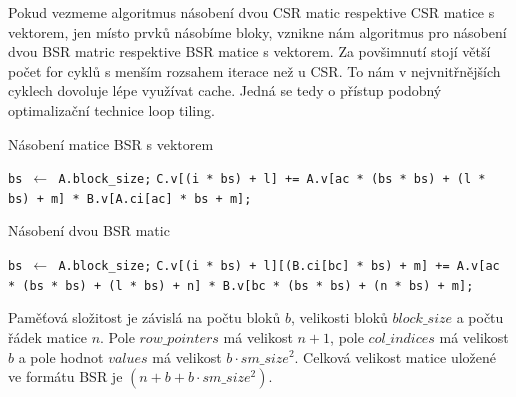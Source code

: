 Pokud vezmeme algoritmus násobení dvou CSR matic respektive CSR matice s vektorem, jen místo prvků násobíme bloky, vznikne nám algoritmus pro násobení dvou BSR matric respektive BSR matice s vektorem. Za povšimnutí stojí větší počet for cyklů s menším rozsahem iterace než u CSR. To nám v nejvnitřnějších cyklech dovoluje lépe využívat cache. Jedná se tedy o přístup podobný optimalizační technice loop tiling\cite{Wolf:1991:DLO:113445.113449}.

\label{alg:bsr-mvm}
\begin{algorithm}[H]
	\caption{Násobení matice BSR s vektorem}\label{bsr-mvm}
	\begin{algorithmic}[1]
		\State \texttt{bs $\gets$ A.block\_size;}
						\State \texttt{C.v[(i * bs) + l] += A.v[ac * (bs * bs) + (l * bs) + m] * B.v[A.ci[ac] * bs + m];}
					\EndFor
				\EndFor
			\EndFor
		\EndFor
		\EndProcedure
	\end{algorithmic}
\end{algorithm}

\label{alg:bsr-mmm}
\begin{algorithm}[H]
	\caption{Násobení dvou BSR matic}\label{bsr-mmm}
	\begin{algorithmic}[1]
		\State \texttt{bs $\gets$ A.block\_size;}
								\State \texttt{C.v[(i * bs) + l][(B.ci[bc] * bs) + m] += A.v[ac * (bs * bs) + (l * bs) + n] * B.v[bc * (bs * bs) + (n * bs) + m];}
							\EndFor
						\EndFor
					\EndFor
				\EndFor
			\EndFor
		\EndFor
		\EndProcedure
	\end{algorithmic}
\end{algorithm}

Paměťová složitost je závislá na počtu bloků $b$, velikosti bloků $block\_size$ a počtu řádek matice $n$. Pole $row\_pointers$ má velikost $n+1$, pole $col\_indices$ má velikost $b$ a pole hodnot $values$ má velikost $b \cdot sm\_size^2$. Celková velikost matice uložené ve formátu BSR je \bigO$(n + b + b \cdot sm\_size^2)$. 

